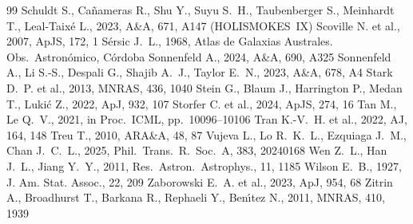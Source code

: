 \documentclass[fleqn,usenatbib]{rasti}
\begin{document}
\begin{thebibliography}{99}
Schuldt S., Ca\~{n}ameras R., Shu Y., Suyu S.~H., Taubenberger S.,
Meinhardt T., Leal-Taix\'{e} L., 2023, A\&A, 671, A147 (HOLISMOKES~IX)
Scoville N. et al., 2007, ApJS, 172, 1
S\'{e}rsic J.~L., 1968, Atlas de Galaxias Australes. Obs.\
Astron\'{o}mico, C\'{o}rdoba
Sonnenfeld A., 2024, A\&A, 690, A325
Sonnenfeld A., Li S.-S., Despali G., Shajib A.~J., Taylor E.~N., 2023,
A\&A, 678, A4
Stark D.~P. et al., 2013, MNRAS, 436, 1040
Stein G., Blaum J., Harrington P., Medan T., Luki\'{c} Z., 2022, ApJ,
932, 107
Storfer C. et al., 2024, ApJS, 274, 16
Tan M., Le Q.~V., 2021, in Proc.\ ICML, pp.\ 10096--10106
Tran K.-V.~H. et al., 2022, AJ, 164, 148
Treu T., 2010, ARA\&A, 48, 87
Vujeva L., Lo R.~K.~L., Ezquiaga J.~M., Chan J.~C.~L., 2025,
Phil.\ Trans.\ R.\ Soc.\ A, 383, 20240168
Wen Z.~L., Han J.~L., Jiang Y.~Y., 2011, Res.\ Astron.\ Astrophys., 11, 1185
\bibitem[\protect\citeauthoryear{Wilson}{1927}]{Wilson1927}
Wilson E.~B., 1927, J. Am. Stat. Assoc., 22, 209
Zaborowski E.~A. et al., 2023, ApJ, 954, 68
Zitrin A., Broadhurst T., Barkana R., Rephaeli Y., Ben\'{\i}tez N., 2011,
MNRAS, 410, 1939
\end{thebibliography}

\appendix

\end{document}
